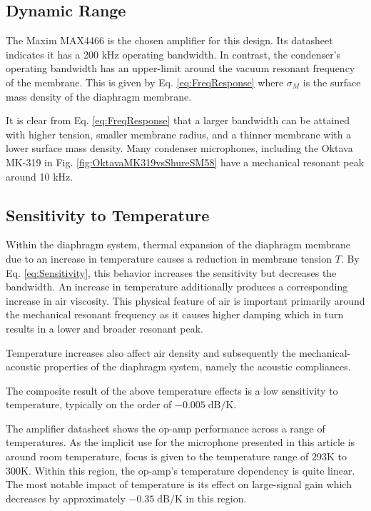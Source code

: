 \documentclass[journal]{IEEEtran}
\begin{document}
\subsection{Dynamic Range}

The Maxim MAX4466 is the chosen amplifier for this design. Its datasheet indicates it has a 200 kHz operating bandwidth. In contrast, the condenser's operating bandwidth has an upper-limit around the vacuum resonant frequency of the membrane. This is given by Eq. \ref{eq:FreqResponse} where $\sigma_M$ is the surface mass density of the diaphragm membrane.

It is clear from Eq. \ref{eq:FreqResponse} that a larger bandwidth can be attained with higher tension, smaller membrane radius, and a thinner membrane with a lower surface mass density. Many condenser microphones, including the Oktava MK-319 in Fig. \ref{fig:OktavaMK319vsShureSM58} have a mechanical resonant peak around 10 kHz.

\subsection{Sensitivity to Temperature}

Within the diaphragm system, thermal expansion of the diaphragm membrane due to an increase in temperature causes a reduction in membrane tension $T$. By Eq. \ref{eq:Sensitivity}, this behavior increases the sensitivity but decreases the bandwidth. An increase in temperature additionally produces a corresponding increase in air viscosity. This physical feature of air is important primarily around the mechanical resonant frequency as it causes higher damping which in turn results in a lower and broader resonant peak. 

Temperature increases also affect air density and subsequently the mechanical-acoustic properties of the diaphragm system, namely the acoustic compliances.

The composite result of the above temperature effects is a low sensitivity to temperature, typically on the order of $-0.005 \; \mathrm{dB/K}$.

The amplifier datasheet shows the op-amp performance across a range of temperatures. As the implicit use for the microphone presented in this article is around room temperature, focus is given to the temperature range of 293K to 300K. Within this region, the op-amp's temperature dependency is quite linear. The most notable impact of temperature is its effect on large-signal gain which decreases by approximately $-0.35 \; \mathrm{dB/K}$ in this region.
\end{document}
